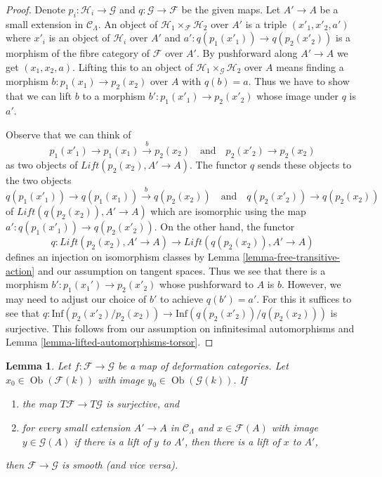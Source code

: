 \documentclass{stacks-project}
\theoremstyle{plain}
\newtheorem{lemma}[subsection]{Lemma}
\theoremstyle{definition}
\theoremstyle{remark}
\numberwithin{equation}{subsection}
\def\Ob{\mathop{\mathrm{Ob}}\nolimits}
\begin{document}
\begin{proof}
Denote $p_i : \mathcal{H}_i \to \mathcal{G}$ and
$q : \mathcal{G} \to \mathcal{F}$ be the given maps.
Let $A' \to A$ be a small extension in $\mathcal{C}_\Lambda$.
An object of $\mathcal{H}_1 \times_\mathcal{F} \mathcal{H}_2$
over $A'$ is a triple $(x'_1, x'_2, a')$ where
$x'_i$ is an object of $\mathcal{H}_i$ over $A'$ and
$a' : q(p_1(x'_1)) \to q(p_2(x'_2))$ is a morphism
of the fibre category of $\mathcal{F}$ over $A'$.
By pushforward along $A' \to A$ we get
$(x_1, x_2, a)$. Lifting this to an object of
$\mathcal{H}_1 \times_\mathcal{G} \mathcal{H}_2$
over $A$ means finding a morphism
$b : p_1(x_1) \to p_2(x_2)$ over $A$ with $q(b) = a$.
Thus we have to show that we can lift $b$ to a morphism
$b' : p_1(x'_1) \to p_2(x'_2)$ whose image under $q$ is $a'$.

\medskip\noindent
Observe that we can think of
$$
p_1(x'_1) \to p_1(x_1) \xrightarrow{b} p_2(x_2)
\quad\text{and}\quad
p_2(x'_2) \to p_2(x_2)
$$
as two objects of $\textit{Lift}(p_2(x_2), A' \to A)$.
The functor $q$ sends these objects to the two objects
$$
q(p_1(x'_1)) \to q(p_1(x_1)) \xrightarrow{b} q(p_2(x_2))
\quad\text{and}\quad
q(p_2(x'_2)) \to q(p_2(x_2))
$$
of $\textit{Lift}(q(p_2(x_2)), A' \to A)$
which are isomorphic using the map $a' : q(p_1(x'_1)) \to q(p_2(x'_2))$.
On the other hand, the functor
$$
q : \textit{Lift}(p_2(x_2), A' \to A) \to
\textit{Lift}(q(p_2(x_2)), A' \to A)
$$
defines an injection on isomorphism classes by
Lemma \ref{lemma-free-transitive-action}
and our assumption on tangent spaces. Thus we see that there is a morphism
$b' : p_1(x_1') \to p_2(x'_2)$ whose pushforward to $A$ is $b$.
However, we may need to adjust our choice of $b'$
to achieve $q(b') = a'$. For this it suffices to see that
$q : \text{Inf}(p_2(x'_2)/p_2(x_2)) \to \text{Inf}(q(p_2(x'_2))/q(p_2(x_2)))$
is surjective. This follows from our assumption on
infinitesimal automorphisms and Lemma \ref{lemma-lifted-automorphisms-torsor}.
\end{proof}

\begin{lemma}
\label{lemma-easy-check-smooth}
Let $f : \mathcal{F} \to \mathcal{G}$ be a map of deformation
categories. Let $x_0 \in \Ob(\mathcal{F}(k))$ with image
$y_0 \in \Ob(\mathcal{G}(k))$. If
\begin{enumerate}
\item the map $T\mathcal{F} \to T\mathcal{G}$ is surjective, and
\item for every small extension $A' \to A$ in $\mathcal{C}_\Lambda$
and $x \in \mathcal{F}(A)$ with image $y \in \mathcal{G}(A)$
if there is a lift of $y$ to $A'$, then there is a lift
of $x$ to $A'$,
\end{enumerate}
then $\mathcal{F} \to \mathcal{G}$ is smooth (and vice versa).
\end{lemma}
\end{document}

